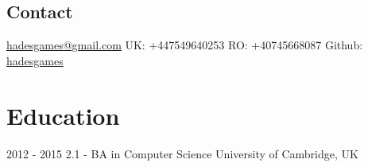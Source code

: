 \documentclass[]{friggeri-cv}
\begin{document}
       {}

\begin{aside}
  \section{Contact}
    \href{mailto:hadesgames@gmail.com}{hadesgames@gmail.com}
    UK: +447549640253
    RO: +40745668087
    Github: \href{http://github.com/hadesgames}{hadesgames}
\end{aside}


\section{Education}

\begin{entrylist}
  \entry
    {2012 - 2015}
    {}
    {2.1 - BA in Computer Science}
    {}
    {University of Cambridge, UK}
   
\end{entrylist}
\end{document}

